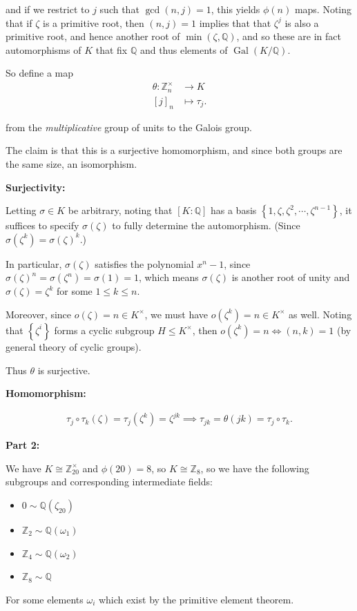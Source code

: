 \begin{solution}
and if we restrict to \(j\) such that \(\gcd(n, j) = 1\), this yields
\(\phi(n)\) maps. Noting that if \(\zeta\) is a primitive root, then
\((n, j) = 1\) implies that that \(\zeta^j\) is also a primitive root,
and hence another root of \(\min(\zeta, {\mathbb{Q}})\), and so these
are in fact automorphisms of \(K\) that fix \({\mathbb{Q}}\) and thus
elements of \(\operatorname{Gal}(K/{\mathbb{Q}})\).

So define a map
\begin{align*}
\theta: {\mathbb{Z}}_n^{\times}&\to K \\
[j]_n &\mapsto \tau_j
.\end{align*}

from the \emph{multiplicative} group of units to the Galois group.

The claim is that this is a surjective homomorphism, and since both
groups are the same size, an isomorphism.

\textbf{Surjectivity:}

Letting \(\sigma \in K\) be arbitrary, noting that \([K: {\mathbb{Q}}]\)
has a basis \(\left\{{1, \zeta, \zeta^2, \cdots, \zeta^{n-1}}\right\}\),
it suffices to specify \(\sigma(\zeta)\) to fully determine the
automorphism. (Since \(\sigma(\zeta^k) = \sigma(\zeta)^k\).)

In particular, \(\sigma(\zeta)\) satisfies the polynomial \(x^n - 1\),
since \(\sigma(\zeta)^n = \sigma(\zeta^n) = \sigma(1) = 1\), which means
\(\sigma(\zeta)\) is another root of unity and
\(\sigma(\zeta) = \zeta^k\) for some \(1\leq k \leq n\).

Moreover, since \(o(\zeta) = n \in K^{\times}\), we must have
\(o(\zeta^k) = n \in K^{\times}\) as well. Noting that
\(\left\{{\zeta^i}\right\}\) forms a cyclic subgroup
\(H\leq K^{\times}\), then \(o(\zeta^k) = n \iff (n, k) = 1\) (by
general theory of cyclic groups).

Thus \(\theta\) is surjective.

\textbf{Homomorphism:}

\begin{align*}
\tau_j \circ \tau_k (\zeta) =\tau_j(\zeta^k) = \zeta^{jk} \implies
\tau_{jk} = \theta(jk) = \tau_j \circ \tau_k
.\end{align*}

\textbf{Part 2:}

We have \(K \cong {\mathbb{Z}}_{20}^{\times}\) and \(\phi(20) = 8\), so
\(K \cong {\mathbb{Z}}_8\), so we have the following subgroups and
corresponding intermediate fields:

\begin{itemize}
\tightlist
\item
  \(0 \sim {\mathbb{Q}}(\zeta_{20})\)
\item
  \({\mathbb{Z}}_2 \sim {\mathbb{Q}}(\omega_1)\)
\item
  \({\mathbb{Z}}_4 \sim {\mathbb{Q}}(\omega_2)\)
\item
  \({\mathbb{Z}}_8 \sim {\mathbb{Q}}\)
\end{itemize}

For some elements \(\omega_i\) which exist by the primitive element
theorem.

\end{solution}

